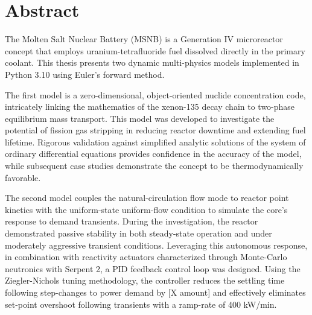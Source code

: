 \chapter{Abstract}
The Molten Salt Nuclear Battery (MSNB) is a Generation IV microreactor concept that employs uranium-tetrafluoride fuel dissolved directly in the primary coolant. This thesis presents two dynamic multi-physics models implemented in Python 3.10 using Euler's forward method. 

The first model is a zero-dimensional, object-oriented nuclide concentration code, intricately linking the mathematics of the xenon-135 decay chain to two-phase equilibrium mass transport. This model was developed to investigate the potential of fission gas stripping in reducing reactor downtime and extending fuel lifetime. Rigorous validation against simplified analytic solutions of the system of ordinary differential equations provides confidence in the accuracy of the model, while subsequent case studies demonstrate the concept to be thermodynamically favorable.

The second model couples the natural-circulation flow mode to reactor point kinetics with the uniform-state uniform-flow condition to simulate the core's response to demand transients. During the investigation, the reactor demonstrated passive stability in both steady-state operation and under moderately aggressive transient conditions. Leveraging this autonomous response, in combination with reactivity actuators characterized through Monte-Carlo neutronics with Serpent 2, a PID feedback control loop was designed. Using the Ziegler-Nichols tuning methodology, the controller reduces the settling time following step-changes to power demand by [X amount] and effectively eliminates set-point overshoot following transients with a ramp-rate of 400 kW/min.

